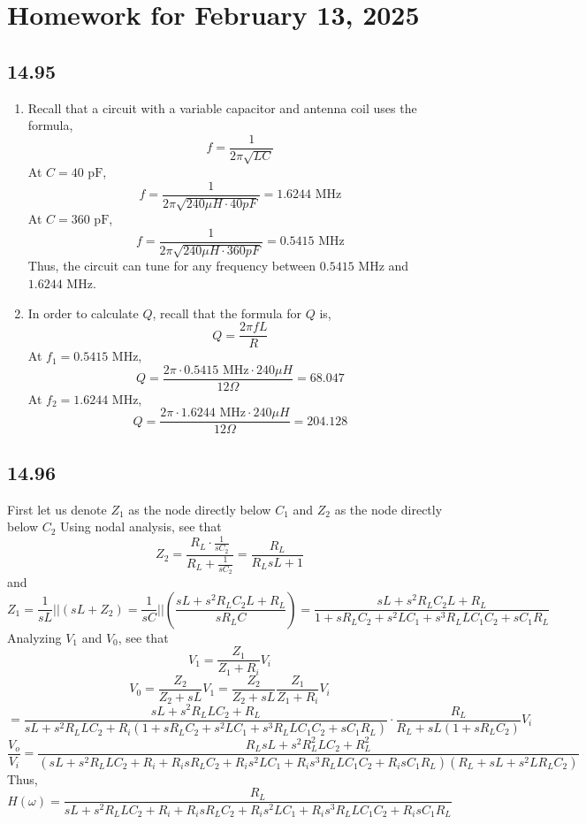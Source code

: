 \documentclass{article}
\begin{document}
\begin{enumerate}[label=(\alph*)]
\end{enumerate}


\section*{Homework for February 13, 2025}

\subsection*{14.95}

\begin{enumerate}[label=(\alph*)]
    \item Recall that a circuit with a variable capacitor and antenna coil uses the formula, 
        $$f=\frac{1}{2\pi \sqrt{LC}}$$
        At $C=40 \text{ pF}$, $$f=\frac{1}{2\pi \sqrt{240 \mu H \cdot 40 pF}}=1.6244 \text{ MHz}$$
        At $C=360 \text{ pF}$, $$f=\frac{1}{2\pi \sqrt{240 \mu H \cdot 360 pF}}=0.5415 \text{ MHz}$$
        Thus, the circuit can tune for any frequency between $0.5415 \text{ MHz}$ and $1.6244 \text{ MHz}$.
    \item In order to calculate $Q$, recall that the formula for $Q$ is,
        $$Q=\frac{2\pi f L}{R}$$
        At $f_1=0.5415 \text{ MHz}$, $$Q=\frac{2\pi \cdot 0.5415 \text{ MHz} \cdot 240 \mu H}{12 \Omega}=68.047$$
        At $f_2=1.6244 \text{ MHz}$, $$Q=\frac{2\pi \cdot 1.6244 \text{ MHz} \cdot 240 \mu H}{12 \Omega}=204.128$$

\end{enumerate}


\subsection*{14.96}

First let us denote $Z_1$ as the node directly below $C_1$ and $Z_2$ as the node directly below $C_2$ Using nodal analysis, see that $$Z_2=\frac{R_L\cdot \frac{1}{sC_2}}{R_L + \frac{1}{sC_2}}=\frac{R_L}{R_LsL + 1}$$ and
$$Z_1=\frac{1}{sL} || (sL + Z_2)=\frac{1}{sC} || \left( \frac{sL + s^2R_LC_2L + R_L}{sR_LC}\right)=\frac{sL+s^2R_LC_2L+R_L}{1 + sR_LC_2 + s^2LC_1 + s^3R_LLC_1C_2 + sC_1R_L}$$
Analyzing $V_1$ and $V_0$, see that $$V_1 = \frac{Z_1}{Z_1 + R_i}V_i$$
$$V_0 = \frac{Z_2}{Z_2 + sL}V_1=\frac{Z_2}{Z_2 + sL} \frac{Z_1}{Z_1 + R_i}V_i$$
$$=\frac{sL + s^2R_LLC_2+R_L}{sL + s^2R_LLC_2 + R_i(1 + sR_LC_2 + s^2LC_1 + s^3R_LLC_1C_2 + sC_1R_L)} \cdot \frac{R_L}{R_L + sL(1 + sR_LC_2)}V_i$$
$$\frac{V_o}{V_i}=\frac{R_LsL + s^2R_L^2LC_2+R_L^2}{(sL + s^2R_LLC_2 + R_i + R_isR_LC_2 + R_is^2LC_1 + R_is^3R_LLC_1C_2 + R_isC_1R_L)(R_L + sL + s^2LR_LC_2)}$$
Thus, $$H(\omega)=\frac{R_L}{sL + s^2R_LLC_2 + R_i + R_isR_LC_2 + R_is^2LC_1 + R_is^3R_LLC_1C_2 + R_isC_1R_L}$$
\end{document}
